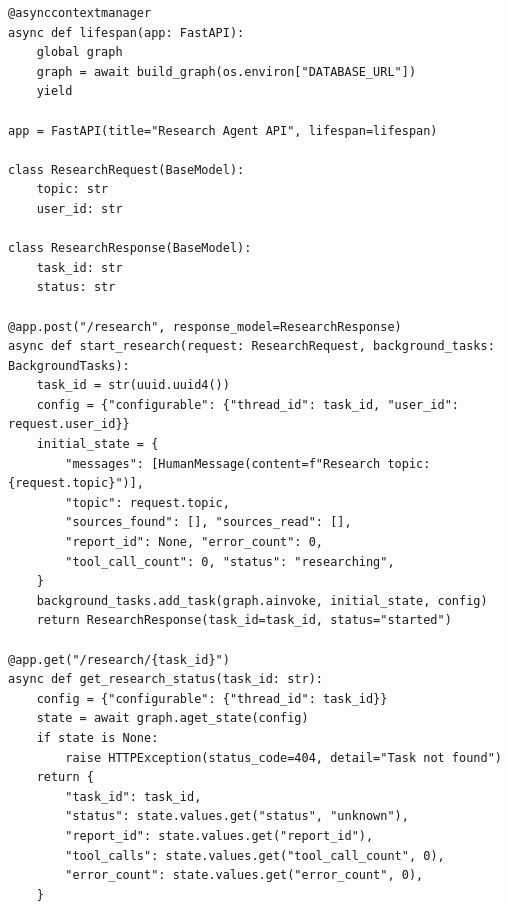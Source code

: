 \begin{lstlisting}[style=pythonstyle, caption={Complete production research agent: graph and deployment}]
@asynccontextmanager
async def lifespan(app: FastAPI):
    global graph
    graph = await build_graph(os.environ["DATABASE_URL"])
    yield

app = FastAPI(title="Research Agent API", lifespan=lifespan)

class ResearchRequest(BaseModel):
    topic: str
    user_id: str

class ResearchResponse(BaseModel):
    task_id: str
    status: str

@app.post("/research", response_model=ResearchResponse)
async def start_research(request: ResearchRequest, background_tasks: BackgroundTasks):
    task_id = str(uuid.uuid4())
    config = {"configurable": {"thread_id": task_id, "user_id": request.user_id}}
    initial_state = {
        "messages": [HumanMessage(content=f"Research topic: {request.topic}")],
        "topic": request.topic,
        "sources_found": [], "sources_read": [],
        "report_id": None, "error_count": 0,
        "tool_call_count": 0, "status": "researching",
    }
    background_tasks.add_task(graph.ainvoke, initial_state, config)
    return ResearchResponse(task_id=task_id, status="started")

@app.get("/research/{task_id}")
async def get_research_status(task_id: str):
    config = {"configurable": {"thread_id": task_id}}
    state = await graph.aget_state(config)
    if state is None:
        raise HTTPException(status_code=404, detail="Task not found")
    return {
        "task_id": task_id,
        "status": state.values.get("status", "unknown"),
        "report_id": state.values.get("report_id"),
        "tool_calls": state.values.get("tool_call_count", 0),
        "error_count": state.values.get("error_count", 0),
    }
\end{lstlisting}

